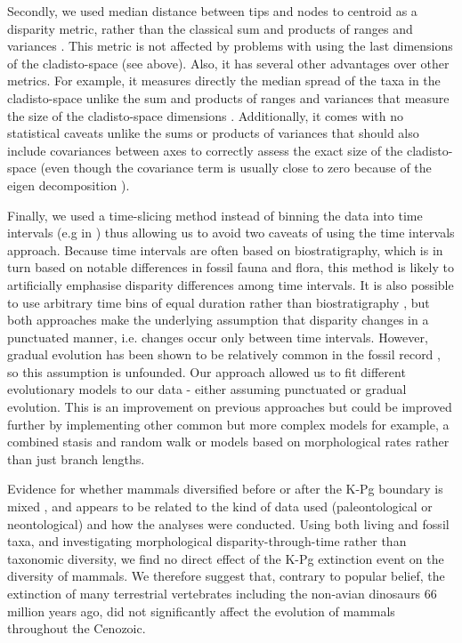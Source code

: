 \documentclass[12pt,letterpaper]{article}
\renewcommand{\subsection}[1]{%
\bigskip
\begin{center}
\begin{large}
\normalfont\itshape #1
\end{large}
\end{center}}
\begin{document}
Secondly, we used median distance between tips and nodes to centroid as a disparity metric, rather than the classical sum and products of ranges and variances \cite{Wills1994}.
This metric is not affected by problems with using the last dimensions of the cladisto-space (see above).
Also, it has several other advantages over other metrics.
For example, it measures directly the median spread of the taxa in the cladisto-space unlike the sum and products of ranges and variances that measure the size of the cladisto-space dimensions \cite{Wills1994}.
Additionally, it comes with no statistical caveats unlike the sums or products of variances that should also include covariances between axes to correctly assess the exact size of the cladisto-space (even though the covariance term is usually close to zero because of the eigen decomposition \cite{GOWER01121966}).

Finally, we used a time-slicing method instead of binning the data into time intervals (e.g in \cite{hopkinsdecoupling2013,bensonfaunal2014}) thus allowing us to avoid two caveats of using the time intervals approach.
Because time intervals are often based on biostratigraphy, which is in turn based on notable differences in fossil fauna and flora, this method is likely to artificially emphasise disparity differences among time intervals.
It is also possible to use arbitrary time bins of equal duration rather than biostratigraphy \cite{Butler2012,hopkinsdecoupling2013,bensonfaunal2014}, but both approaches make the underlying assumption that disparity changes in a punctuated  manner, i.e. changes occur only between time intervals.
However, gradual evolution has been shown to be relatively common in the fossil record \cite{Hunt21042015}, so this assumption is unfounded.
Our approach allowed us to fit different evolutionary models to our data - either assuming punctuated or gradual evolution.
This is an improvement on previous approaches but could be improved further by implementing other common but more complex models for example, a combined stasis and random walk \cite{Hunt21042015} or models based on morphological rates rather than just branch lengths.

Evidence for whether mammals diversified before or after the K-Pg boundary is mixed \cite{meredithimpacts2011,OLeary08022013,dosReis2014,beckancient2014}, and appears to be related to the kind of data used (paleontological or neontological) and how the analyses were conducted.
Using both living and fossil taxa, and investigating morphological disparity-through-time rather than taxonomic diversity, we find no direct effect of the K-Pg extinction event on the diversity of mammals. 
We therefore suggest that, contrary to popular belief, the extinction of many terrestrial vertebrates including the non-avian dinosaurs 66 million years ago, did not significantly affect the evolution of mammals throughout the Cenozoic.
\end{document}
